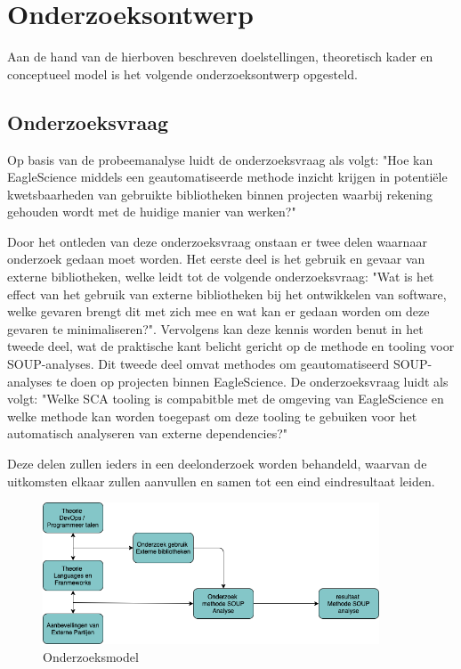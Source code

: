 \section{Onderzoeksontwerp}\label{sec:OP_onderzoeksontwerp}
Aan de hand van de hierboven beschreven doelstellingen, theoretisch kader en conceptueel model is het volgende onderzoeksontwerp opgesteld.

\subsection{Onderzoeksvraag}\label{subsec:onderzoeksvraag-en-deelvragen}
Op basis van de probeemanalyse luidt de onderzoeksvraag als volgt: "Hoe kan EagleScience middels een geautomatiseerde methode inzicht krijgen in potentiële kwetsbaarheden van gebruikte bibliotheken binnen projecten waarbij rekening gehouden wordt met de huidige manier van werken?"

Door het ontleden van deze onderzoeksvraag onstaan er twee delen waarnaar onderzoek gedaan moet worden. Het eerste deel is het gebruik en gevaar van externe bibliotheken, welke leidt tot de volgende onderzoeksvraag: "Wat is het effect van het gebruik van externe bibliotheken bij het ontwikkelen van software, welke gevaren brengt dit met zich mee en wat kan er gedaan worden om deze gevaren te minimaliseren?". Vervolgens kan deze kennis worden benut in het tweede deel, wat de praktische kant belicht gericht op de methode en tooling voor SOUP-analyses. Dit tweede deel omvat methodes om geautomatiseerd SOUP-analyses te doen op projecten binnen EagleScience. De onderzoeksvraag luidt als volgt: "Welke SCA tooling is compabitble met de omgeving van EagleScience en welke methode kan worden toegepast om deze tooling te gebuiken voor het automatisch analyseren van externe dependencies?"

Deze delen zullen ieders in een deelonderzoek worden behandeld, waarvan de uitkomsten elkaar zullen aanvullen en samen tot een eind eindresultaat leiden.
\begin{figure}[H]
    \myfloatalign
    \includegraphics[width=10cm]{gfx/Onderzoekmodel}
    \caption{Onderzoeksmodel}
    \label{fig:OnderzoeksModel}
\end{figure}

